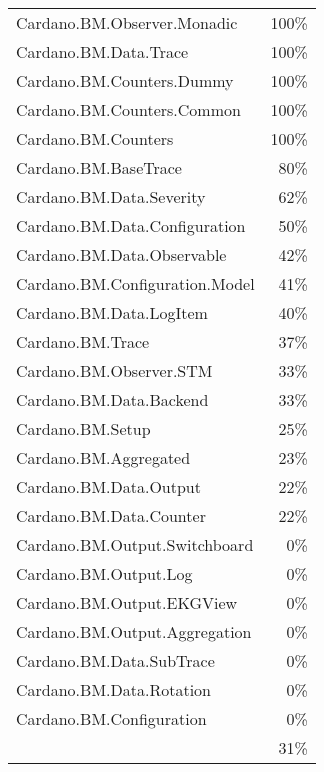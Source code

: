 \begin{tabular}{l r}
   Cardano.BM.Observer.Monadic & 100\% \\
   Cardano.BM.Data.Trace & 100\% \\
   Cardano.BM.Counters.Dummy & 100\% \\
   Cardano.BM.Counters.Common & 100\% \\
   Cardano.BM.Counters & 100\% \\
   Cardano.BM.BaseTrace & 80\% \\
   Cardano.BM.Data.Severity & 62\% \\
   Cardano.BM.Data.Configuration & 50\% \\
   Cardano.BM.Data.Observable & 42\% \\
   Cardano.BM.Configuration.Model & 41\% \\
   Cardano.BM.Data.LogItem & 40\% \\
   Cardano.BM.Trace & 37\% \\
   Cardano.BM.Observer.STM & 33\% \\
   Cardano.BM.Data.Backend & 33\% \\
   Cardano.BM.Setup & 25\% \\
   Cardano.BM.Aggregated & 23\% \\
   Cardano.BM.Data.Output & 22\% \\
   Cardano.BM.Data.Counter & 22\% \\
   Cardano.BM.Output.Switchboard & 0\% \\
   Cardano.BM.Output.Log & 0\% \\
   Cardano.BM.Output.EKGView & 0\% \\
   Cardano.BM.Output.Aggregation & 0\% \\
   Cardano.BM.Data.SubTrace & 0\% \\
   Cardano.BM.Data.Rotation & 0\% \\
   Cardano.BM.Configuration & 0\% \\
    & 31\% \\
\end{tabular}
